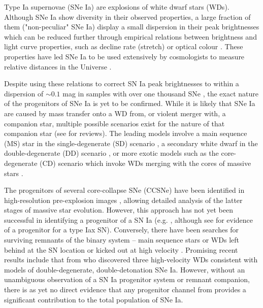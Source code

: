\documentclass[fleqn,usenatbib]{mnras}
\begin{document}
Type Ia supernovae (SNe Ia) are explosions of white dwarf stars (WDs). Although SNe Ia show diversity in their observed properties, a large fraction of them ("non-peculiar" SNe Ia) display a small dispersion in their peak brightnesses which can be reduced further through empirical relations between brightness and light curve properties, such as decline rate (stretch) or optical colour \citep{Rust1974,Pskovskii1977,Phillips1993,Tripp1998}. These properties have led SNe Ia to be used extensively by cosmologists to measure relative distances in the Universe \citep{Riess1998,Perlmutter1999}.

Despite using these relations to correct SN Ia peak brightnesses to within a dispersion of $\sim 0.1$ mag in samples with over one thousand SNe \citep{Scolnic2018}, the exact nature of the progenitors of SNe Ia is yet to be confirmed. While it is likely that SNe Ia are caused by mass transfer onto a WD from, or violent merger with, a companion star, multiple possible scenarios exist for the nature of that companion star (see \citealt{Maoz2014,Ruiter2020} for reviews). The leading models involve a main sequence (MS) star in the single-degenerate (SD) scenario \citep{Whelan1973,Nomoto1982}, a secondary white dwarf in the double-degenerate (DD) scenario \citep{Tutukov1976,Iben1984,Webbink1984}, or more exotic models such as the core-degenerate (CD) scenario which invoke WDs merging with the cores of massive stars \citep{Kashi2011,Ilkov2011}. 

The progenitors of several core-collapse SNe (CCSNe) have been identified in high-resolution pre-explosion images \citep{Smartt2009,Eldridge2013}, allowing detailed analysis of the latter stages of massive star evolution. However, this approach has not yet been successful in identifying a progenitor of a SN Ia (e.g. \citealt{Graur2014a,Kelly2014,Graur2019}, although see \citet{McCully2014} for evidence of a progenitor for a type Iax SN). Conversely, there have been searches for surviving remnants of the binary system -- main sequence stars or WDs left behind at the SN location or kicked out at high velocity \citep[e.g.][]{Schaefer2012,Ruiz-Lapuente2018,Kerzendorf2018,Kerzendorf2019}. Promising recent results include that from \citet{Shen2018} who discovered three high-velocity WDs consistent with models of double-degenerate, double-detonation SNe Ia. However, without an unambiguous observation of a SN Ia progenitor system or remnant companion, there is as yet no direct evidence that any progenitor channel from provides a significant contribution to the total population of SNe Ia.
\end{document}
